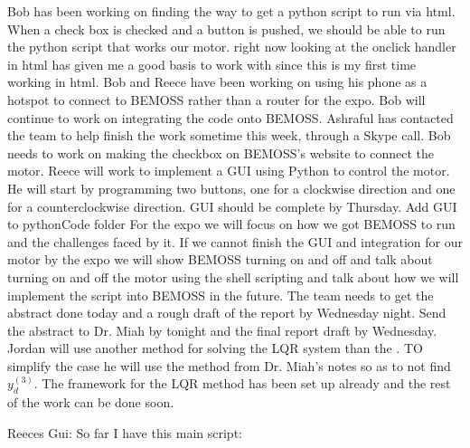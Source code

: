 \documentclass[fontsize=11pt, %
                             paper=letter, %
                             twoside, %
                             captions=tableheading,
                             index=totoc,
                             hyperref]{labbook}
\begin{document}
Bob has been working on finding the way to get a python script to run via html. When a check box is checked and a button is pushed, we should be able to run the python script that works our motor. right now looking at the onclick handler in html has given me a good basis to work with since this is my first time working in html.
\newline
Bob and Reece have been working on using his phone as a hotspot to connect to BEMOSS rather than a router for the expo.
\newline
Bob will continue to work on integrating the code onto BEMOSS. Ashraful has contacted the team to help finish the work sometime this week, through a Skype call. Bob needs to work on making the checkbox on BEMOSS's website to connect the motor. 
\newline
Reece will work to implement a GUI using Python to control the motor. He will start by programming two buttons, one for a clockwise direction and one for a counterclockwise direction. GUI should be complete by Thursday. Add GUI to pythonCode folder
\newline
For the expo we will focus on how we got BEMOSS to run and the challenges faced by it. If we cannot finish the GUI and integration for our motor by the expo we will show BEMOSS turning on and off and talk about turning on and off the motor using the shell scripting and talk about how we will implement the script into BEMOSS in the future.
\newline
The team needs to get the abstract done today and a rough draft of the report by Wednesday night. Send the abstract to Dr. Miah by tonight and the final report draft by Wednesday.
\newline
Jordan will use another method for solving the LQR system than the \cite{Khan2004}. TO simplify the case he will use the method from Dr. Miah's notes so as to not find $y_d^{(3)}$. The framework for the LQR method has been set up already and the rest of the work can be done soon. 


Reeces Gui:
So far I have this main script:
\end{document}
